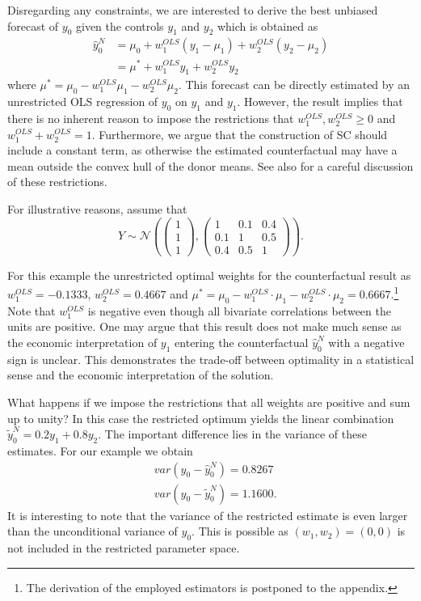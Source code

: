 Disregarding any constraints, we are interested to derive the best unbiased forecast of $y_0$ given the controls $y_1$ and $y_2$ which is obtained as
\begin{equation*}
	\begin{split}
		\widehat{y}^{N}_{0} & = \mu_0 + w_1^{OLS} (y_1 - \mu_1) + w_2^{OLS} (y_2 - \mu_2) \\
		& = \mu^* + w_1^{OLS} y_1 + w_2^{OLS} y_2
	\end{split}
\end{equation*}
where $\mu^* = \mu_0 - w_1^{OLS} \mu_1 - w_2^{OLS} \mu_2$. This forecast can be directly estimated by an unrestricted \ac{OLS} regression of $y_0$ on $y_1$ and $y_1$. However, the result implies that there is no inherent reason to impose the restrictions that $w_1^{OLS}, w_2^{OLS} \geq 0$ and $w_1^{OLS} + w_2^{OLS} = 1$. Furthermore, we argue that the construction of \ac{SC} should include a constant term, as otherwise the estimated counterfactual may have a mean outside the convex hull of the donor means. See also \cite{doudchenko:2016} for a careful discussion of these restrictions. 

For illustrative reasons, assume that 
\[
Y \sim \mathcal{N}\left( 
\begin{pmatrix} 1\\ 1\\ 1 \end{pmatrix}, 
\begin{pmatrix} 1 &0.1 &0.4\\0.1 &1 &0.5\\0.4 &0.5 &1 \end{pmatrix}\right). 
\] 

For this example the unrestricted optimal weights for the counterfactual result as $w_1^{OLS} = -0.1333$, $w_2^{OLS} = 0.4667$ and $\mu^* = \mu_0 - w_1^{OLS} \cdot \mu_1 - w_2^{OLS} \cdot \mu_2 = 0.6667$.\footnote{The derivation of the employed estimators is postponed to the appendix.} Note that $w_1^{OLS}$ is negative even though all bivariate correlations between the units are positive. One may argue that this result does not make much sense as the economic interpretation of $y_1$ entering the counterfactual $\widehat{y}^{N}_{0}$ with a negative sign is unclear. This demonstrates the trade-off between optimality in a statistical sense and the economic interpretation of the solution.  

What happens if we impose the restrictions that all weights are positive and sum up to unity? In this case the restricted optimum yields the linear combination $\widetilde{y}^{N}_{0} = 0.2 y_1 + 0.8 y_2$.
The important difference lies in the variance of these estimates. For our example we obtain
\begin{equation*}
	\begin{split}
		& var(y_0 - \widehat{y}^{N}_{0}) = 0.8267 \\
		& var(y_0 - \widetilde{y}^{N}_{0}) = 1.1600.
	\end{split}
\end{equation*}
It is interesting to note that the variance of the restricted estimate is even larger than the unconditional variance of $y_0$. This is possible as $(w_1, w_2) = (0,0)$ is not included in the restricted parameter space. 

